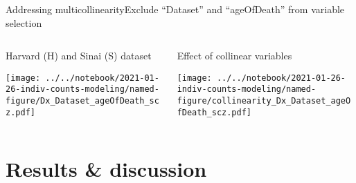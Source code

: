 \documentclass[usenames,dvipsnames]{beamer}
\begin{document}
\begin{frame}{Addressing multicollinearity}{Exclude ``Dataset'' and
		``ageOfDeath'' from variable selection}
\begin{columns}[t]
\begin{column}{0.5\textwidth}
\begin{center}
\small
Harvard (H) and Sinai (S) dataset

\texttt{[image: ../../notebook/2021-01-26-indiv-counts-modeling/named-figure/Dx\_Dataset\_ageOfDeath\_scz.pdf]}

\end{center}
\end{column}

\begin{column}{0.5\textwidth}
\begin{center}
\small
Effect of collinear variables

\texttt{[image: ../../notebook/2021-01-26-indiv-counts-modeling/named-figure/collinearity\_Dx\_Dataset\_ageOfDeath\_scz.pdf]}
\end{center}
\end{column}
\end{columns}
\end{frame}

\section{Results \& discussion}
\end{document}
